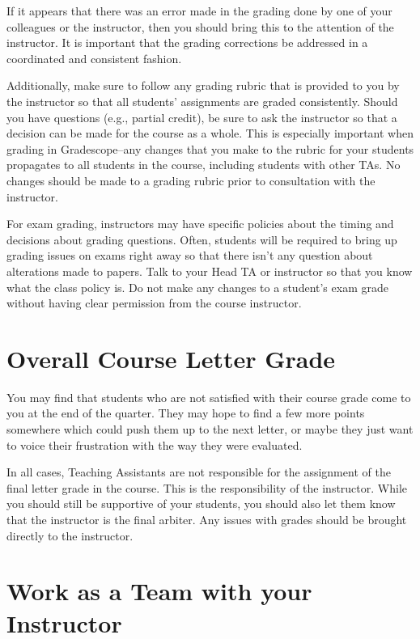 \documentclass[
  letterpaper,
  DIV=11,
  numbers=noendperiod]{scrreprt}
\begin{document}
If it appears that there was an error made in the grading done by one of
your colleagues or the instructor, then you should bring this to the
attention of the instructor. It is important that the grading
corrections be addressed in a coordinated and consistent fashion.

Additionally, make sure to follow any grading rubric that is provided to
you by the instructor so that all students' assignments are graded
consistently. Should you have questions (e.g., partial credit), be sure
to ask the instructor so that a decision can be made for the course as a
whole. This is especially important when grading in Gradescope--any
changes that you make to the rubric for your students propagates to all
students in the course, including students with other TAs. No changes
should be made to a grading rubric prior to consultation with the
instructor.

For exam grading, instructors may have specific policies about the
timing and decisions about grading questions. Often, students will be
required to bring up grading issues on exams right away so that there
isn't any question about alterations made to papers. Talk to your Head
TA or instructor so that you know what the class policy is. Do not make
any changes to a student's exam grade without having clear permission
from the course instructor.

\hypertarget{overall-course-letter-grade}{%
\section{Overall Course Letter
Grade}\label{overall-course-letter-grade}}

You may find that students who are not satisfied with their course grade
come to you at the end of the quarter. They may hope to find a few more
points somewhere which could push them up to the next letter, or maybe
they just want to voice their frustration with the way they were
evaluated.

In all cases, Teaching Assistants are not responsible for the assignment
of the final letter grade in the course. This is the responsibility of
the instructor. While you should still be supportive of your students,
you should also let them know that the instructor is the final arbiter.
Any issues with grades should be brought directly to the instructor.

\hypertarget{work-as-a-team-with-your-instructor}{%
\section{Work as a Team with your
Instructor}\label{work-as-a-team-with-your-instructor}}
\end{document}
